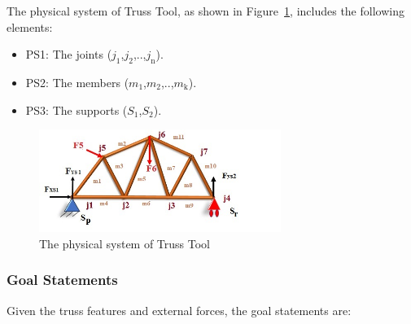 \documentclass[12pt]{article}
\begin{document}
The physical system of Truss Tool, as shown in Figure~\ref{fig_physys},
includes the following elements:

\begin{itemize}

\item{PS1: The joints ($j_\text{1}$,$j_\text{2}$,..,$j_\text{n}$).}
\item{PS2: The members ($m_\text{1}$,$m_\text{2}$,..,$m_\text{k}$).}
\item{PS3: The supports ($S_\text{1}$,$S_\text{2}$).}

\end{itemize}


 \begin{figure}[h!]
\begin{center}
 
  \includegraphics[width=0.7\textwidth]{physic_system.jpg}
 
 \caption{The physical system of Truss Tool}
 \label{fig_physys}
 \end{center}
 \end{figure}

\subsubsection{Goal Statements} \label{Sec_gs}


\noindent Given the truss features and external forces, the goal statements are:
\end{document}
